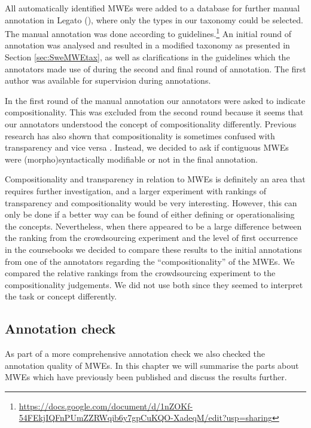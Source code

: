 \documentclass[output=paper,colorlinks,citecolor=brown]{langscibook}
\begin{document}
All automatically identified MWEs were added to a database for further manual annotation in Legato (\cite{alfter2019legato}), where only the types in our taxonomy could be selected. The manual annotation was done according to guidelines.\footnote{\url{https://docs.google.com/document/d/1nZOKf-54FEkjIQFnPUmZZRWqib6y7gpCuKQO-XadeqM/edit?usp=sharing}}  
An initial round of annotation was analysed and resulted in a modified taxonomy as presented in Section \ref{sec:SweMWEtax}, as well as clarifications in the guidelines which the annotators made use of during the second and final round of annotation.  
The first author was available for supervision during annotations.  



In the first round of the manual annotation 
our annotators were asked to indicate compositionality. This was excluded from the second round because it seems that our annotators understood the concept of compositionality differently.
Previous research has also shown that compositionality is sometimes confused with transparency and vice versa \citep[][]{cieslicka2015idiom,Nunberg_etal_1994}. Instead, we decided to ask if contiguous MWEs were (morpho)syntactically modifiable or not in the final annotation. 

Compositionality and transparency in relation to MWEs is definitely an area that requires further investigation, and a larger experiment with rankings of transparency and compositionality would be very interesting. However, this can only be done if a better way can be found of either defining or operationalising the concepts.
Nevertheless, when there appeared to be a large difference between the ranking from the crowdsourcing experiment and the level of first occurrence in the coursebooks we decided to compare these results to the initial annotations from one of the annotators regarding the “compositionality” of the MWEs. We compared the relative rankings from the crowdsourcing experiment to the compositionality judgements. We did not use both since they seemed to interpret the task or concept differently. 

\subsection{Annotation check} \label{sec:Check}
As part of a more comprehensive annotation check \citep{volodina2022annotation} we also checked the annotation quality of MWEs. In this chapter we will summarise the parts about MWEs which have previously been published and discuss the results further.
\end{document}
